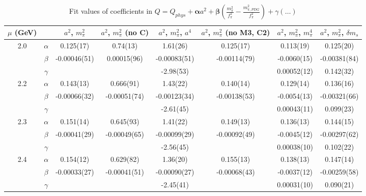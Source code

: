 \documentclass[12pt]{extarticle}
\begin{document}
\begin{table}[h!]
\begin{center}
\begin{tabular}{|c c|c|c|c|c|c|c|}
\hline
$\mu$ (GeV) &  & $a^2$, $m_\pi^2$& $a^2$, $m_\pi^2$ (no C)& $a^2$, $m_\pi^2$, $a^4$& $a^2$, $m_\pi^2$ (no M3, C2)& $a^2$, $m_\pi^2$, $m_\pi^4$& $a^2$, $m_\pi^2$, $\delta m_s$\\
\hline
\multirow{3}{0.5in}{2.0} & $\alpha$ & 0.125(17)& 0.74(13)& 1.61(26)& 0.125(17)& 0.113(19)& 0.125(20)\\
 & $\beta$ & -0.00046(51)& 0.00015(96)& -0.00083(51)& -0.00114(79)& -0.0060(15)& -0.00381(84)\\
 & $\gamma$ &  &  & -2.98(53)&  & 0.00052(12)& 0.142(32)\\
\hline
\multirow{3}{0.5in}{2.2} & $\alpha$ & 0.143(13)& 0.666(91)& 1.43(22)& 0.140(14)& 0.129(14)& 0.136(16)\\
 & $\beta$ & -0.00066(32)& -0.00051(74)& -0.00123(34)& -0.00138(53)& -0.0054(13)& -0.00321(66)\\
 & $\gamma$ &  &  & -2.61(45)&  & 0.00043(11)& 0.099(23)\\
\hline
\multirow{3}{0.5in}{2.3} & $\alpha$ & 0.151(14)& 0.645(93)& 1.41(22)& 0.149(13)& 0.136(13)& 0.144(15)\\
 & $\beta$ & -0.00041(29)& -0.00049(65)& -0.00099(29)& -0.00092(49)& -0.0045(12)& -0.00297(62)\\
 & $\gamma$ &  &  & -2.56(45)&  & 0.00038(10)& 0.102(22)\\
\hline
\multirow{3}{0.5in}{2.4} & $\alpha$ & 0.154(12)& 0.629(82)& 1.36(20)& 0.155(13)& 0.138(13)& 0.147(14)\\
 & $\beta$ & -0.00033(27)& -0.00041(51)& -0.00090(27)& -0.00068(43)& -0.0037(12)& -0.00259(58)\\
 & $\gamma$ &  &  & -2.45(41)&  & 0.00031(10)& 0.090(21)\\
\hline
\end{tabular}
\caption{Fit values of coefficients in $Q = Q_{phys} + \mathbf{\alpha} a^2 + \mathbf{\beta}\left(\frac{m_\pi^2}{f_\pi^2}-\frac{m_{\pi,PDG}^2}{f_\pi^2}\right) + \gamma(\ldots)$}
\end{center}
\end{table}






\end{document}
